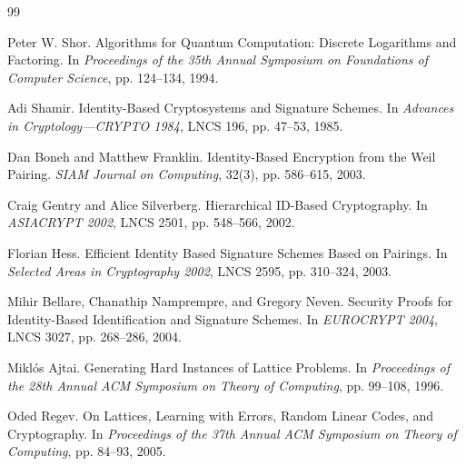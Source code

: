 \documentclass[UTF8,a4paper,12pt,oneside,openany,fontset=fandol]{ctexrep}
\newcommand{\reportheader}{全国密码技术竞赛作品设计报告}
\renewcommand{\headrulewidth}{0pt}
\renewcommand{\footrulewidth}{0pt}
\renewcommand{\headrulewidth}{0.4pt}
\renewcommand{\footrulewidth}{0pt}
\begin{document}
\clearpage
\hypersetup{pageanchor=true}
\pagestyle{frontmatter}
\begingroup
\linespread{1.15}\selectfont
\tableofcontents
\clearpage
\endgroup
{}
\fancypagestyle{plain}{
  \fancyhf{}
  \fancyhead[C]{\small\songti\reportheader}
  \fancyfoot[C]{\small\thepage}
  \renewcommand{\headrulewidth}{0.4pt}
  \renewcommand{\footrulewidth}{0pt}
}
\pagestyle{mainmatter}











\clearpage
{}
\begin{thebibliography}{99}
\small

Peter W. Shor.
Algorithms for Quantum Computation: Discrete Logarithms and Factoring.
In \emph{Proceedings of the 35th Annual Symposium on Foundations of Computer Science},
pp. 124--134, 1994.

Adi Shamir.
Identity-Based Cryptosystems and Signature Schemes.
In \emph{Advances in Cryptology---CRYPTO 1984}, LNCS 196, pp. 47--53, 1985.

Dan Boneh and Matthew Franklin.
Identity-Based Encryption from the Weil Pairing.
\emph{SIAM Journal on Computing}, 32(3), pp. 586--615, 2003.

Craig Gentry and Alice Silverberg.
Hierarchical ID-Based Cryptography.
In \emph{ASIACRYPT 2002}, LNCS 2501, pp. 548--566, 2002.

Florian Hess.
Efficient Identity Based Signature Schemes Based on Pairings.
In \emph{Selected Areas in Cryptography 2002}, LNCS 2595, pp. 310--324, 2003.

Mihir Bellare, Chanathip Namprempre, and Gregory Neven.
Security Proofs for Identity-Based Identification and Signature Schemes.
In \emph{EUROCRYPT 2004}, LNCS 3027, pp. 268--286, 2004.

Miklós Ajtai.
Generating Hard Instances of Lattice Problems.
In \emph{Proceedings of the 28th Annual ACM Symposium on Theory of Computing},
pp. 99--108, 1996.

Oded Regev.
On Lattices, Learning with Errors, Random Linear Codes, and Cryptography.
In \emph{Proceedings of the 37th Annual ACM Symposium on Theory of Computing},
pp. 84--93, 2005.


\end{thebibliography}
\end{document}
